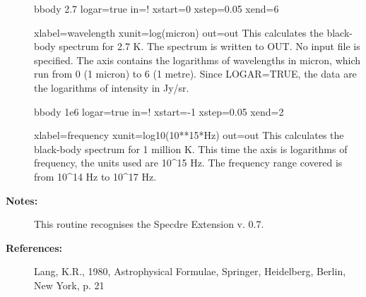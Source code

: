 \begin{description}
\begin{terminalv}
bbody 2.7 logar=true in=! xstart=0 xstep=0.05 xend=6

xlabel=wavelength xunit=log(micron) out=out
   This calculates the black-body spectrum for 2.7 K. The spectrum
   is written to OUT. No input file is specified. The axis
   contains the logarithms of wavelengths in micron, which run
   from 0 (1 micron) to 6 (1 metre). Since LOGAR=TRUE, the data
   are the logarithms of intensity in Jy/sr.

bbody 1e6 logar=true in=! xstart=-1 xstep=0.05 xend=2

xlabel=frequency xunit=log10(10**15*Hz) out=out
   This calculates the black-body spectrum for 1 million K. This
   time the axis is logarithms of frequency, the units used are
   10^15 Hz. The frequency range covered is from 10^14 Hz to
   10^17 Hz.
\end{terminalv}

\item [\textbf{Notes:}]
This routine recognises the Specdre Extension v. 0.7.

\item [\textbf{References:}]
   Lang, K.R., 1980, Astrophysical Formulae, Springer, Heidelberg,
   Berlin, New York, p. 21

\end{description}
